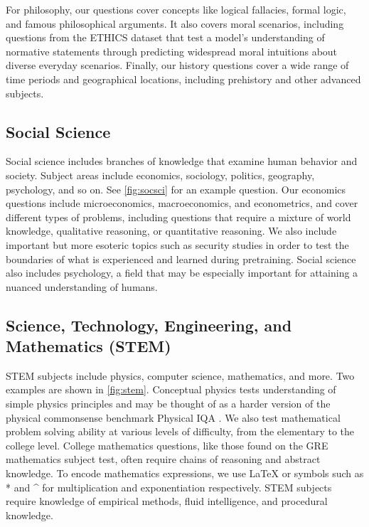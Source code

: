 For philosophy, our questions cover concepts like logical fallacies, formal logic, and famous philosophical arguments. It also covers moral scenarios, including questions from the ETHICS dataset \citep{hendrycks2020ethicsdataset} that test a model's understanding of normative statements through predicting widespread moral intuitions about diverse everyday scenarios. Finally, our history questions cover a wide range of time periods and geographical locations, including prehistory and other advanced subjects.

\subsection{Social Science} Social science includes branches of knowledge that examine human behavior and society. Subject areas include economics, sociology, politics, geography, psychology, and so on. See \ref{fig:socsci} for an example question. Our economics questions include microeconomics, macroeconomics, and econometrics, and cover different types of problems, including questions that require a mixture of world knowledge, qualitative reasoning, or quantitative reasoning. We also include important but more esoteric topics such as security studies in order to test the boundaries of what is experienced and learned during pretraining. Social science also includes psychology, a field that may be especially important for attaining a nuanced understanding of humans.

\subsection{Science, Technology, Engineering, and Mathematics (STEM)} STEM subjects include physics, computer science, mathematics, and more. Two examples are shown in \ref{fig:stem}. Conceptual physics tests understanding of simple physics principles and may be thought of as a harder version of the physical commonsense benchmark Physical IQA \citep{bisk2019physicaliqa}. We also test mathematical problem solving ability at various levels of difficulty, from the elementary to the college level. College mathematics questions, like those found on the GRE mathematics subject test, often require chains of reasoning and abstract knowledge. To encode mathematics expressions, we use LaTeX or symbols such as * and \^{} for multiplication and exponentiation respectively. STEM subjects require knowledge of empirical methods, fluid intelligence, and procedural knowledge.

